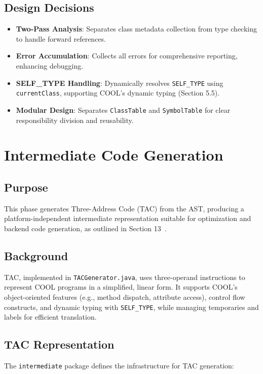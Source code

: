 \documentclass[11pt, titlepage]{article}
\begin{document}
\subsection{Design Decisions}
\begin{itemize}[leftmargin=*]
    \item \textbf{Two-Pass Analysis}: Separates class metadata collection from type checking to handle forward references.
    \item \textbf{Error Accumulation}: Collects all errors for comprehensive reporting, enhancing debugging.
    \item \textbf{SELF\_TYPE Handling}: Dynamically resolves \texttt{SELF\_TYPE} using \texttt{currentClass}, supporting COOL's dynamic typing (Section 5.5).
    \item \textbf{Modular Design}: Separates \texttt{ClassTable} and \texttt{SymbolTable} for clear responsibility division and reusability.
\end{itemize}

\section{Intermediate Code Generation}
\label{sec:tac}

\subsection{Purpose}
This phase generates Three-Address Code (TAC) from the AST, producing a platform-independent intermediate representation suitable for optimization and backend code generation, as outlined in Section 13~\cite{cool_manual}.

\subsection{Background}
TAC, implemented in \texttt{TACGenerator.java}, uses three-operand instructions to represent COOL programs in a simplified, linear form. It supports COOL's object-oriented features (e.g., method dispatch, attribute access), control flow constructs, and dynamic typing with \texttt{SELF\_TYPE}, while managing temporaries and labels for efficient translation.

\subsection{TAC Representation}
The \texttt{intermediate} package defines the infrastructure for TAC generation:
\end{document}
